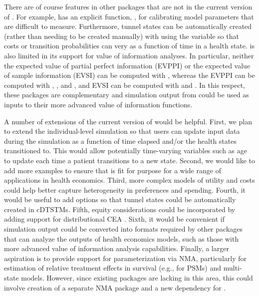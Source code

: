 \documentclass[article, nojss]{jss}\usepackage[]{graphicx}\usepackage[]{color}
\begin{document}
There are of course features in other  packages that are not in the current version of . For example,  has an explicit function, , for calibrating model parameters that are difficult to measure. Furthermore, tunnel states can be automatically created (rather than needing to be created manually) with  using the  variable so that costs or transition probabilities can very as a function of time in a health state.  is also limited in its support for value of information analyses. In particular, neither the expected value of partial perfect information (EVPPI) or the expected value of sample information (EVSI) can be computed with , whereas the EVPPI can be computed with , , and , and EVSI can be computed with  and . In this respect, these packages are complementary and simulation output from  could be used as inputs to their more advanced value of information functions.

A number of extensions of the current version of  would be helpful. First, we plan to extend the individual-level simulation so that users can update input data during the simulation as a function of time elapsed and/or the health states transitioned to. This would allow potentially time-varying variables such as age to update each time a patient transitions to a new state. Second, we would like to add more examples to ensure that  is fit for purpose for a wide range of applications in health economics. Third, more complex models of utility \citep{kharroubi2007modelling, hernandez2013relationship} and costs \citep{nixon2005methods} could help better capture heterogeneity in preferences and spending. Fourth, it would be useful to add options so that tunnel states could be automatically created in cDTSTMs. Fifth, equity considerations could be incorporated by adding support for distributional CEA \citep{asaria2015distributional, asaria2016distributional, cookson2017using}. Sixth, it would be convenient if  simulation output could be converted into formats required by other packages that can analyze the outputs of health economics models, such as those with more advanced value of information analysis capabilities. Finally, a larger aspiration is to provide support for parameterization via NMA, particularly for estimation of relative treatment effects in survival (e.g., for PSMs) and multi-state models. However, since existing  packages are lacking in this area, this could involve creation of a separate NMA package and a new dependency for . 
\end{document}
